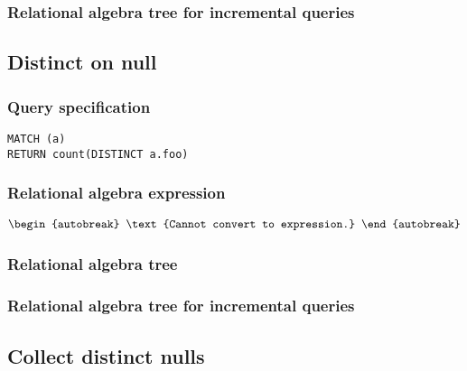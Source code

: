 
\subsubsection*{Relational algebra tree for incremental queries}


\subsection{Distinct on null}

\subsubsection*{Query specification}

\begin{lstlisting}
MATCH (a)
RETURN count(DISTINCT a.foo)
\end{lstlisting}

\subsubsection*{Relational algebra expression}

\begin{align*}
\begin{autobreak}
\text{Cannot convert to expression.}
\end{autobreak}
\end{align*}

\subsubsection*{Relational algebra tree}


\subsubsection*{Relational algebra tree for incremental queries}


\subsection{Collect distinct nulls}

